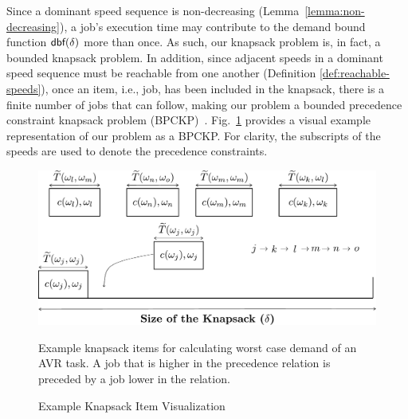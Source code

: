 Since a dominant speed sequence is non-decreasing (Lemma~\ref{lemma:non-decreasing}), a job's execution time may contribute to the demand bound function $\mbox{\sf dbf}(\delta)$ more than once.
As such, our knapsack problem is, in fact, a bounded knapsack problem.
In addition, since  adjacent speeds in a dominant speed sequence must be reachable from one another (Definition \ref{def:reachable-speeds}), once an item, i.e., job, has been included in the knapsack, there is a finite number of jobs that can follow, making our problem a bounded precedence constraint knapsack problem (BPCKP)~\cite{cho_depth-first_1997,johnson_knapsacks_1983}.
Fig.~\ref{fig:Knapsack1} provides a visual example representation of our problem as a BPCKP.
For clarity, the subscripts of the speeds are used to denote the precedence constraints.
\begin{figure}
\centering
\includegraphics[width=1.0\linewidth]{fig/vectorKnapsackv2.pdf}
\caption{Example Knapsack Item Visualization} Example knapsack items for calculating worst case demand of an AVR task. A job that is higher in the precedence relation is preceded by a job lower in the relation.
\label{fig:Knapsack1}
\end{figure}



